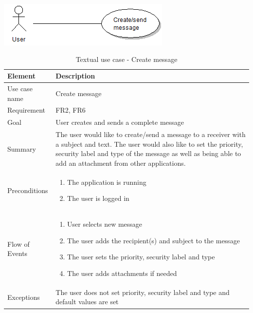 \begin{table}
\begin{center}
\begin{center}
\includegraphics[width=\textwidth]{create_message}
\end{center}
\begin{tabular}{p{3cm}|p{12cm}} \hline
\textbf{Element} & \textbf{Description} \\ \hline \hline
Use case name & Create message \\
Requirement & FR2, FR6 \\
Goal & User creates and sends a complete message \\ \hline
Summary &The user would like to create/send a message to a receiver with a subject and text. The user would also like to set the priority, security label and type of the message as well as being able to add an attachment from other applications. \\ \hline
Preconditions &
\begin{enumerate}
\item{}The application is running
\item{}The user is logged in
\end{enumerate} \\ \hline
Flow of Events &
\begin{enumerate}
\item{}User selects new message
\item{}The user adds the recipient(s) and subject to the message
\item{}The user sets the priority, security label and type
\item{}The user adds attachments if needed
\end{enumerate} \\ \hline
Exceptions & The user does not set priority, security label and type and default values are set\\ \hline
\end{tabular}
\end{center}
\caption{Textual use case - Create message} \label{tab:createmessage}
\end{table}

